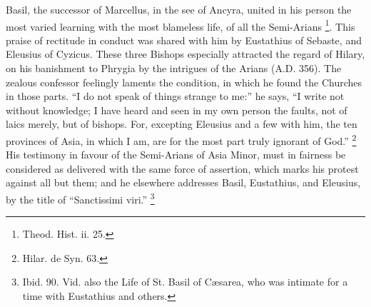 Basil, the successor of Marcellus, in the see of Ancyra, united in
his person the most varied learning with the most blameless life, of
all the Semi-Arians \footnote{Theod. Hist. ii. 25.}.
This praise of rectitude in conduct was shared with him by Eustathius
of Sebaste, and Eleusius of Cyzicus. These three Bishops especially
attracted the regard of Hilary, on his banishment to Phrygia by the
intrigues of the Arians (A.D. 356). The zealous
confessor feelingly laments the condition, in which he found the
Churches in those parts. ``I do not speak of things strange to
me:'' he says, ``I write not without knowledge; I have heard
and seen in my own person the faults, not of laics merely, but of
bishops. For, excepting Eleusius and a few with him, the ten provinces
of Asia, in which I am, are for the most part truly ignorant of
God.'' \footnote{Hilar. de Syn. 63.} His
testimony in favour of the Semi-Arians of Asia Minor, must in fairness
be considered as delivered with the same force of assertion, which
marks his protest against all but them; and he elsewhere addresses
Basil, Eustathius, and Eleusius, by the title of ``Sanctissimi
viri.'' \footnote{Ibid. 90. Vid. also the Life of St. Basil
of Cæsarea, who was intimate for a time with Eustathius and others.}

